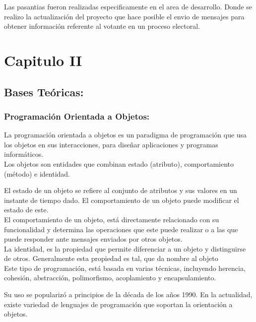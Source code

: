 \documentclass[spanish]{article}
\begin{document}
Las pasantias fueron realizadas especificamente en el area de desarrollo. Donde se realizo la actualización del proyecto que hace posible el envio de mensajes para obtener información referente al votante en un proceso electoral.

\section{Capitulo II}

\subsection{Bases Teóricas:}

\subsubsection{Programación Orientada a Objetos:}

La programación orientada a objetos es un paradigma de programación que usa los objetos en sus interacciones, para diseñar aplicaciones y programas informáticos. \\

Los objetos son entidades que combinan estado (atributo), comportamiento (método) e identidad.

El estado de un objeto se refiere al conjunto de atributos y sus valores en un instante de tiempo dado. El comportamiento de un objeto puede modificar el estado de este.
\\
El comportamiento de un objeto, está directamente relacionado con su funcionalidad y determina las operaciones que este puede realizar o a las que puede responder ante mensajes enviados por otros objetos. \\

La identidad, es la propiedad que permite diferenciar a un objeto y distinguirse de otros. Generalmente esta propiedad es tal, que da nombre al objeto \\

Este tipo de programación, está basada en varias técnicas, incluyendo herencia, cohesión, abstracción, polimorfismo, acoplamiento y encapsulamiento.

Su uso se popularizó a principios de la década de los años 1990. En la actualidad, existe variedad de lenguajes de programación que soportan la orientación a objetos.
\end{document}
